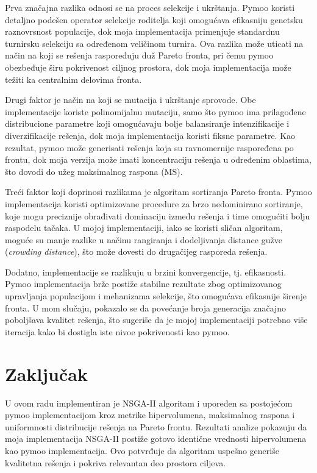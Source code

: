 \documentclass[12pt]{article}
\begin{document}
Prva značajna razlika odnosi se na proces selekcije i ukrštanja.
Pymoo koristi detaljno podešen operator selekcije roditelja koji omogućava efikasniju genetsku raznovrsnost populacije, dok moja implementacija primenjuje standardnu turnirsku selekciju sa određenom veličinom turnira.  Ova razlika može uticati na način na koji se rešenja raspoređuju duž Pareto fronta, pri čemu pymoo obezbeđuje širu pokrivenost ciljnog prostora, dok moja implementacija može težiti ka centralnim delovima fronta.

Drugi faktor je način na koji se mutacija i ukrštanje sprovode. Obe implementacije koriste polinomijalnu mutaciju, samo što pymoo ima prilagođene distribucione parametre koji omogućavaju bolje balansiranje intenzifikacije i diverzifikacije rešenja, dok moja implementacija koristi fiksne parametre.  Kao rezultat, pymoo može generisati rešenja koja su ravnomernije raspoređena po frontu, dok moja verzija može imati koncentraciju rešenja u određenim oblastima, što dovodi do užeg maksimalnog raspona (MS).

Treći faktor koji doprinosi razlikama je algoritam sortiranja Pareto fronta. Pymoo implementacija koristi optimizovane procedure za brzo nedominirano sortiranje, koje mogu preciznije obrađivati dominaciju između rešenja i time omogućiti bolju raspodelu tačaka. U mojoj implementaciji, iako se koristi sličan algoritam, moguće su manje razlike u načinu rangiranja i dodeljivanja distance gužve (\textit{crowding distance}), što može dovesti do drugačijeg rasporeda rešenja.

Dodatno, implementacije se razlikuju u brzini konvergencije, tj. efikasnosti. Pymoo implementacija brže postiže stabilne rezultate zbog optimizovanog upravljanja populacijom i mehanizama selekcije, što omogućava efikasnije širenje fronta. U mom slučaju, pokazalo se da povećanje broja generacija značajno poboljšava kvalitet rešenja, što sugeriše da je mojoj implementaciji potrebno više iteracija kako bi dostigla iste nivoe pokrivenosti kao pymoo.

\section{Zaključak}
U ovom radu implementiran je NSGA-II algoritam i upoređen sa postojećom pymoo implementacijom kroz metrike hipervolumena, maksimalnog raspona i uniformnosti distribucije rešenja na Pareto frontu.
Rezultati analize pokazuju da moja implementacija NSGA-II postiže gotovo identične vrednosti hipervolumena kao pymoo implementacija. Ovo potvrđuje da algoritam uspešno generiše kvalitetna rešenja i pokriva relevantan deo prostora ciljeva.
\end{document}
